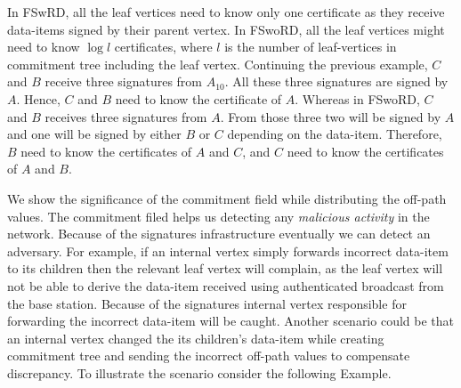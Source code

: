 		In FSwRD, all the leaf vertices need to know only one certificate as they receive data-items signed by their parent vertex.
		In FSwoRD, all the leaf vertices might need to know $\log l$ certificates, where $l$ is the number of leaf-vertices in commitment tree including the leaf vertex.
		Continuing the previous example, $C$ and $B$ receive three signatures from $A_{10}$. 
		All these three signatures are signed by $A$.
		Hence, $C$ and $B$ need to know the certificate of $A$.  
		Whereas in FSwoRD, $C$ and $B$ receives three signatures from $A$.
		From those three two will be signed by $A$ and one will be signed by either $B$ or $C$ depending on the data-item. 
		Therefore, $B$ need to know the certificates of $A$ and $C$, and $C$ need to know the certificates of $A$ and $B$.

		We show the significance of the commitment field while distributing the off-path values. 
		The commitment filed helps us detecting any \textit{malicious activity} in the network. 
		Because of the signatures infrastructure eventually we can detect an adversary. 
		For example, if an internal vertex simply forwards incorrect data-item to its children then the relevant leaf vertex will complain, as the leaf vertex will not be able to derive the data-item received using authenticated broadcast from the base station.
		Because of the signatures internal vertex responsible for forwarding the incorrect data-item will be caught.
		Another scenario could be that an internal vertex changed the its children's data-item while creating commitment tree and sending the incorrect off-path values to compensate discrepancy. 
		To illustrate the scenario consider the following Example.

